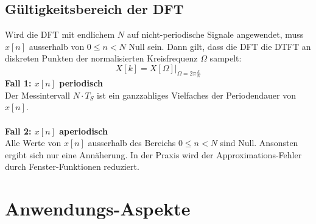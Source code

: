 \subsection{Gültigkeitsbereich der DFT}
Wird die DFT mit endlichem $N$ auf nicht-periodische Signale angewendet, 
muss $x[n]$ ausserhalb von $0 \leq n < N$ Null sein. Dann gilt, dass die 
DFT die DTFT an diskreten Punkten der normalisierten Kreisfrequenz $\Omega$ sampelt:
\[ X[k] = X[\Omega]|_{\Omega=2\pi\frac{k}{N}} \]
\textbf{Fall 1: $x[n]$ periodisch}\\ 
Der Messintervall $N\cdot T_S$ ist ein ganzzahliges Vielfaches der Periodendauer
von $x[n]$.\\
\\
\textbf{Fall 2: $x[n]$ aperiodisch}\\
Alle Werte von $x[n]$ ausserhalb des Bereichs $0\leq n<N$ sind Null. Ansonsten 
ergibt sich nur eine Annäherung. In der Praxis wird der Approximations-Fehler 
durch Fenster-Funktionen reduziert.

\section{Anwendungs-Aspekte}
